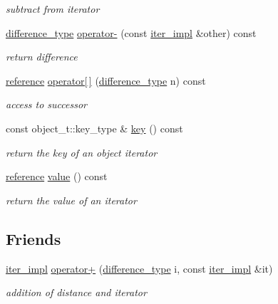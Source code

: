 \begin{DoxyCompactItemize}
\begin{DoxyCompactList}\small\item\em subtract from iterator \end{DoxyCompactList}\item 
\mbox{\hyperlink{classnlohmann_1_1detail_1_1iter__impl_a2f7ea9f7022850809c60fc3263775840}{difference\+\_\+type}} \mbox{\hyperlink{classnlohmann_1_1detail_1_1iter__impl_a49bf3e708a9c1c88c415011735962d06}{operator-\/}} (const \mbox{\hyperlink{classnlohmann_1_1detail_1_1iter__impl}{iter\+\_\+impl}} \&other) const
\begin{DoxyCompactList}\small\item\em return difference \end{DoxyCompactList}\item 
\mbox{\hyperlink{classnlohmann_1_1detail_1_1iter__impl_a5be8001be099c6b82310f4d387b953ce}{reference}} \mbox{\hyperlink{classnlohmann_1_1detail_1_1iter__impl_ac0b9276f1102ed4b9cd3f5f56287e3ce}{operator\mbox{[}$\,$\mbox{]}}} (\mbox{\hyperlink{classnlohmann_1_1detail_1_1iter__impl_a2f7ea9f7022850809c60fc3263775840}{difference\+\_\+type}} n) const
\begin{DoxyCompactList}\small\item\em access to successor \end{DoxyCompactList}\item 
const object\+\_\+t\+::key\+\_\+type \& \mbox{\hyperlink{classnlohmann_1_1detail_1_1iter__impl_a15dfb2744fed2ef40c12a9e9a20d6dbc}{key}} () const
\begin{DoxyCompactList}\small\item\em return the key of an object iterator \end{DoxyCompactList}\item 
\mbox{\hyperlink{classnlohmann_1_1detail_1_1iter__impl_a5be8001be099c6b82310f4d387b953ce}{reference}} \mbox{\hyperlink{classnlohmann_1_1detail_1_1iter__impl_ab447c50354c6611fa2ae0100ac17845c}{value}} () const
\begin{DoxyCompactList}\small\item\em return the value of an iterator \end{DoxyCompactList}\end{DoxyCompactItemize}
\subsection*{Friends}
\begin{DoxyCompactItemize}
\item 
\mbox{\hyperlink{classnlohmann_1_1detail_1_1iter__impl}{iter\+\_\+impl}} \mbox{\hyperlink{classnlohmann_1_1detail_1_1iter__impl_a94108d1a7563e103534f23eb5c1ee175}{operator+}} (\mbox{\hyperlink{classnlohmann_1_1detail_1_1iter__impl_a2f7ea9f7022850809c60fc3263775840}{difference\+\_\+type}} i, const \mbox{\hyperlink{classnlohmann_1_1detail_1_1iter__impl}{iter\+\_\+impl}} \&it)
\begin{DoxyCompactList}\small\item\em addition of distance and iterator \end{DoxyCompactList}\end{DoxyCompactItemize}


